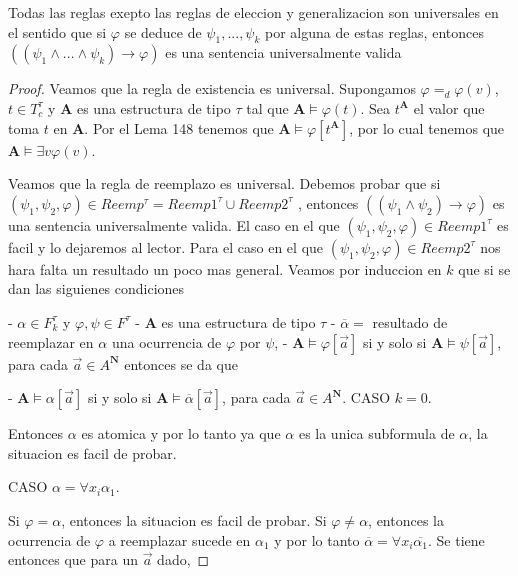   \begin{lemma}
    Todas las reglas exepto las reglas de eleccion y generalizacion son universales en el sentido que si \(\varphi \) se deduce de \(\psi _{1},...,\psi _{k}\) por alguna de estas reglas, entonces \(\left( (\psi _{1}\wedge ...\wedge \psi _{k})\rightarrow \varphi \right) \) es una sentencia universalmente valida
  \end{lemma}
  \begin{proof}
    Veamos que la regla de existencia es universal. Supongamos \(\varphi =_{d}\varphi (v)\), \(t\in T_{c}^{\tau }\) y \(\mathbf{A}\) es una estructura de tipo \(\tau \) tal que \(\mathbf{A}\models \varphi (t)\). Sea \(t^{\mathbf{A}}\) el valor que toma \(t\) en \(\mathbf{A}\). Por el Lema 148 tenemos que \(\mathbf{A}\models \varphi \left[ t^{\mathbf{A}}\right] \), por lo cual tenemos que \(\mathbf{A}\models \exists v\varphi (v)\).

    Veamos que la regla de reemplazo es universal. Debemos probar que si \((\psi _{1},\psi _{2},\varphi )\in Reemp^{\tau }=Reemp1^{\tau }\cup Reemp2^{\tau }\) , entonces \(\left( (\psi _{1}\wedge \psi _{2})\rightarrow \varphi \right) \) es una sentencia universalmente valida. El caso en el que \((\psi _{1},\psi _{2},\varphi )\in Reemp1^{\tau }\) es facil y lo dejaremos al lector. Para el caso en el que \((\psi _{1},\psi _{2},\varphi )\in Reemp2^{\tau }\) nos hara falta un resultado un poco mas general. Veamos por induccion en \(k\) que si se dan las siguienes condiciones

    - \(\alpha \in F_{k}^{\tau }\) y \(\varphi ,\psi \in F^{\tau }\)
    - \(\mathbf{A}\) es una estructura de tipo \(\tau \)
    - \(\overline{\alpha }=\) resultado de reemplazar en \(\alpha \) una ocurrencia de \(\varphi \) por \(\psi \),
    - \(\mathbf{A}\models \varphi \left[ \vec{a}\right] \) si y solo si \( \mathbf{A}\models \psi \left[ \vec{a}\right] \), para cada \(\vec{a}\in A^{ \mathbf{N}}\)
    entonces se da que

    - \(\mathbf{A}\models \alpha \left[ \vec{a}\right] \) si y solo si \( \mathbf{A}\models \overline{\alpha }\left[ \vec{a}\right] \), para cada \(\vec{ a}\in A^{\mathbf{N}}\).
    CASO \(k=0.\)

    Entonces \(\alpha \) es atomica y por lo tanto ya que \(\alpha \) es la unica subformula de \(\alpha \), la situacion es facil de probar.

    CASO \(\alpha =\forall x_{i}\alpha _{1}.\)

    Si \(\varphi =\alpha \), entonces la situacion es facil de probar. Si \(\varphi \neq \alpha \), entonces la ocurrencia de \(\varphi \) a reemplazar sucede en \(\alpha _{1}\) y por lo tanto \(\overline{\alpha }=\forall x_{i} \overline{\alpha _{1}}.\) Se tiene entonces que para un \(\vec{a}\) dado,


\end{proof}
